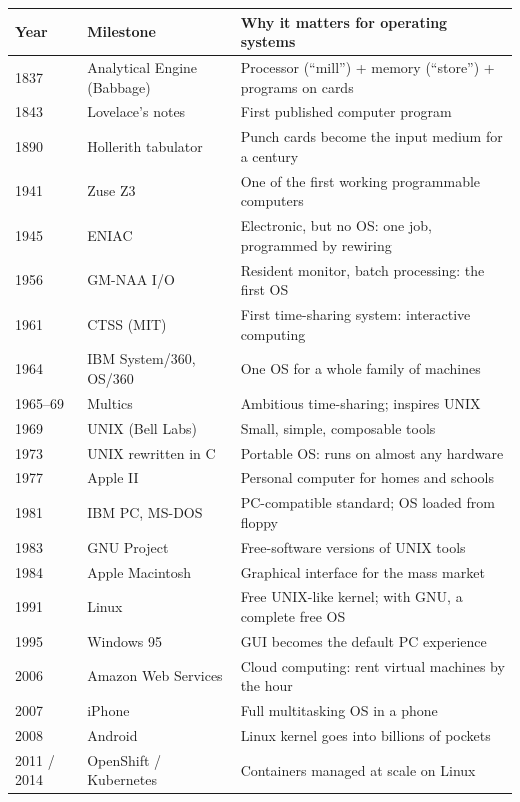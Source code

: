 \documentclass[11pt,a4paper]{article}
\begin{document}
\begin{center}
\small
\renewcommand{\arraystretch}{1.25}
\begin{longtable}{@{}p{1.9cm}p{4.3cm}p{8.4cm}@{}}
\toprule
\textbf{Year} & \textbf{Milestone} & \textbf{Why it matters for operating systems} \\
\midrule
\endhead
1837 & Analytical Engine (Babbage) & Processor (``mill'') + memory (``store'') + programs on cards \\
1843 & Lovelace's notes & First published computer program \\
1890 & Hollerith tabulator & Punch cards become the input medium for a century \\
1941 & Zuse Z3 & One of the first working programmable computers \\
1945 & ENIAC & Electronic, but no OS: one job, programmed by rewiring \\
1956 & GM-NAA I/O & Resident monitor, batch processing: the first OS \\
1961 & CTSS (MIT) & First time-sharing system: interactive computing \\
1964 & IBM System/360, OS/360 & One OS for a whole family of machines \\
1965--69 & Multics & Ambitious time-sharing; inspires UNIX \\
1969 & UNIX (Bell Labs) & Small, simple, composable tools \\
1973 & UNIX rewritten in C & Portable OS: runs on almost any hardware \\
1977 & Apple II & Personal computer for homes and schools \\
1981 & IBM PC, MS-DOS & PC-compatible standard; OS loaded from floppy \\
1983 & GNU Project & Free-software versions of UNIX tools \\
1984 & Apple Macintosh & Graphical interface for the mass market \\
1991 & Linux & Free UNIX-like kernel; with GNU, a complete free OS \\
1995 & Windows 95 & GUI becomes the default PC experience \\
2006 & Amazon Web Services & Cloud computing: rent virtual machines by the hour \\
2007 & iPhone & Full multitasking OS in a phone \\
2008 & Android & Linux kernel goes into billions of pockets \\
2011 / 2014 & OpenShift / Kubernetes & Containers managed at scale on Linux \\
\bottomrule
\end{longtable}
\end{center}
\end{document}
